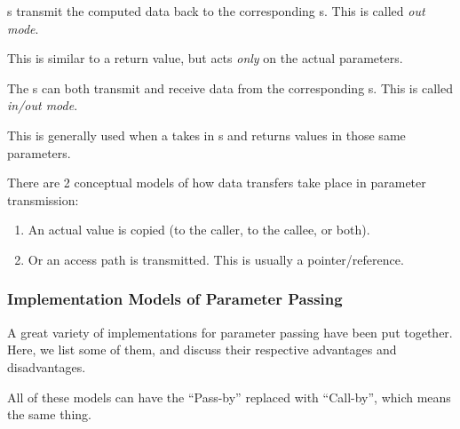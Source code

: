 \begin{definition}\label{def:Parameter_Passing-Out_Mode}
  s transmit the computed data back to the corresponding s.
  This is called \emph{out mode}.

  This is similar to a return value, but acts \emph{only} on the actual parameters.
\end{definition}

\begin{definition}\label{def:Parameter_Passing-Inout_Mode}
  The s can both transmit and receive data from the corresponding s.
  This is called \emph{in/out mode}.

  This is generally used when a  takes in s and returns values in those same parameters.
\end{definition}

There are 2 conceptual models of how data transfers take place in parameter transmission:
\begin{enumerate}[noitemsep]
\item An actual value is copied (to the caller, to the callee, or both).
\item Or an access path is transmitted. This is usually a pointer/reference.
\end{enumerate}

\subsubsection{Implementation Models of Parameter Passing}\label{subsubsec:Implementation_Models_Parameter_Passing}
A great variety of implementations for parameter passing have been put together.
Here, we list some of them, and discuss their respective advantages and disadvantages.

\begin{remark*}[Call-by-...]
  All of these models can have the ``Pass-by'' replaced with ``Call-by'', which means the same thing.
\end{remark*}

